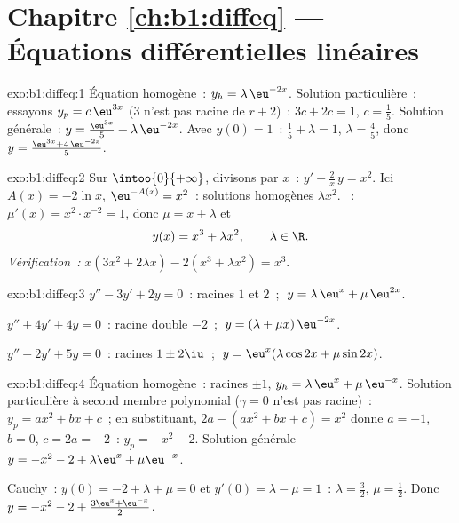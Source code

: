 \section*{Chapitre \ref{ch:b1:diffeq} --- Équations différentielles linéaires}

\begin{solution}{exo:b1:diffeq:1}
Équation homogène~: $y_h = \lambda\,\eu^{-2x}$. Solution
particulière~: essayons $y_p = c\,\eu^{3x}$ ($3$ n'est pas racine de
$r + 2$)~: $3c + 2c = 1$, $c = \frac15$. Solution générale~: $y =
\frac{\eu^{3x}}{5} + \lambda\,\eu^{-2x}$. Avec $y(0) = 1$~: $\frac15 +
\lambda = 1$, $\lambda = \frac45$, donc $y = \frac{\eu^{3x} +
4\,\eu^{-2x}}{5}$.
\end{solution}

\begin{solution}{exo:b1:diffeq:2}
Sur $\intoo{0}{+\infty}$, divisons par $x$~: $y' - \frac{2}{x}\,y =
x^2$. Ici $A(x) = -2\ln x$, $\eu^{-A(x)} = x^2$~: solutions homogènes
$\lambda x^2$. ~: $\mu'(x) = x^2 \cdot x^{-2}
= 1$, donc $\mu = x + \lambda$ et
\[
y(x) = x^3 + \lambda x^2, \qquad \lambda \in \R .
\]
\emph{Vérification~:} $x(3x^2 + 2\lambda x) - 2(x^3 + \lambda x^2) =
x^3$.
\end{solution}

\begin{solution}{exo:b1:diffeq:3}
$y'' - 3y' + 2y = 0$~: racines $1$ et $2$~; $\;y = \lambda\,\eu^{x} +
\mu\,\eu^{2x}$.

$y'' + 4y' + 4y = 0$~: racine double $-2$~; $\;y = (\lambda + \mu
x)\,\eu^{-2x}$.

$y'' - 2y' + 5y = 0$~: racines $1 \pm 2\iu$~; $\;y =
\eu^{x}(\lambda\cos 2x + \mu\sin 2x)$.
\end{solution}

\begin{solution}{exo:b1:diffeq:4}
Équation homogène~: racines $\pm 1$, $y_h = \lambda\,\eu^x +
\mu\,\eu^{-x}$. Solution particulière à second membre polynomial
($\gamma = 0$ n'est pas racine)~: $y_p = ax^2 + bx + c$~; en
substituant, $2a - (ax^2 + bx + c) = x^2$ donne $a = -1$, $b = 0$, $c
= 2a = -2$~: $y_p = -x^2 - 2$. Solution générale $y = -x^2 - 2 +
\lambda\eu^x + \mu\eu^{-x}$.

Cauchy~: $y(0) = -2 + \lambda + \mu = 0$ et $y'(0) = \lambda - \mu =
1$~: $\lambda = \frac32$, $\mu = \frac12$. Donc
$y = -x^2 - 2 + \frac{3\eu^x + \eu^{-x}}{2}$.
\end{solution}

